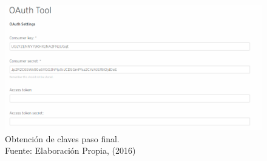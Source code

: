 \begin{figure}[H]
        \centering
        \captionsetup{justification=centering}
        \includegraphics[scale=0.6]{images/TwitterKeys.png}
        \caption[Obtención de claves paso final.]{Obtención de claves paso final.\\Fuente: Elaboración Propia, (2016)}
        \label{fig:TwitterKeys}
\end{figure}
